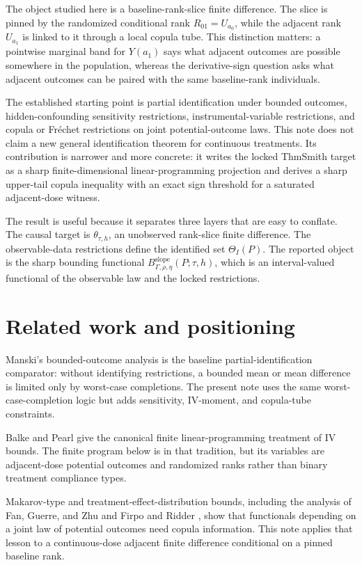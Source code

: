 \documentclass[11pt]{article}
\theoremstyle{definition}
\theoremstyle{plain}
\theoremstyle{remark}
\begin{document}
The object studied here is a baseline-rank-slice finite difference.  The slice is pinned by the randomized conditional rank \(R_{01}=U_{a_0}\), while the adjacent rank \(U_{a_1}\) is linked to it through a local copula tube.  This distinction matters: a pointwise marginal band for \(Y(a_1)\) says what adjacent outcomes are possible somewhere in the population, whereas the derivative-sign question asks what adjacent outcomes can be paired with the same baseline-rank individuals.

The established starting point is partial identification under bounded outcomes, hidden-confounding sensitivity restrictions, instrumental-variable restrictions, and copula or Fr\'echet restrictions on joint potential-outcome laws.  This note does not claim a new general identification theorem for continuous treatments.  Its contribution is narrower and more concrete: it writes the locked ThmSmith target as a sharp finite-dimensional linear-programming projection and derives a sharp upper-tail copula inequality with an exact sign threshold for a saturated adjacent-dose witness.

The result is useful because it separates three layers that are easy to conflate.  The causal target is \(\theta_{\tau,h}\), an unobserved rank-slice finite difference.  The observable-data restrictions define the identified set \(\Theta_I(P)\).  The reported object is the sharp bounding functional \(B_{\Gamma,\rho,\eta}^{\mathrm{slope}}(P;\tau,h)\), which is an interval-valued functional of the observable law and the locked restrictions.

\section{Related work and positioning}
Manski's bounded-outcome analysis \cite{Manski1990} is the baseline partial-identification comparator: without identifying restrictions, a bounded mean or mean difference is limited only by worst-case completions.  The present note uses the same worst-case-completion logic but adds sensitivity, IV-moment, and copula-tube constraints.

Balke and Pearl \cite{BalkePearl1997} give the canonical finite linear-programming treatment of IV bounds.  The finite program below is in that tradition, but its variables are adjacent-dose potential outcomes and randomized ranks rather than binary treatment compliance types.

Makarov-type and treatment-effect-distribution bounds, including the analysis of Fan, Guerre, and Zhu \cite{FanGuerreZhu2017} and Firpo and Ridder \cite{FirpoRidder2019}, show that functionals depending on a joint law of potential outcomes need copula information.  This note applies that lesson to a continuous-dose adjacent finite difference conditional on a pinned baseline rank.
\end{document}
